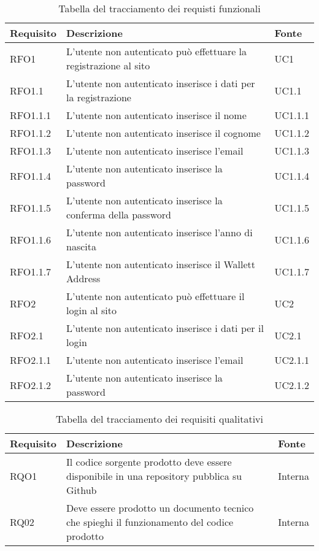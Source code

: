 \begin{table}[H]
\caption{Tabella del tracciamento dei requisti funzionali}
\label{tab:requisiti-funzionali}
\renewcommand{\arraystretch}{1.6}
\begin{tabularx}{\textwidth}{lXl}
\hline\hline
\textbf{Requisito} & \textbf{Descrizione} & \textbf{Fonte}\\
\hline
RFO1 & L'utente non autenticato può effettuare la registrazione al sito & UC1 \\
\hline
RFO1.1 & L'utente non autenticato inserisce i dati per la registrazione & UC1.1 \\
\hline
RFO1.1.1 & L'utente non autenticato inserisce il nome & UC1.1.1 \\
\hline
RFO1.1.2 & L'utente non autenticato inserisce il cognome & UC1.1.2 \\
\hline
RFO1.1.3 & L'utente non autenticato inserisce l'email & UC1.1.3 \\
\hline
RFO1.1.4 & L'utente non autenticato inserisce la password & UC1.1.4 \\
\hline
RFO1.1.5 & L'utente non autenticato inserisce la conferma della password & UC1.1.5 \\
\hline
RFO1.1.6 & L'utente non autenticato inserisce l'anno di nascita & UC1.1.6 \\
\hline
RFO1.1.7 & L'utente non autenticato inserisce il Wallett Address & UC1.1.7 \\
\hline
RFO2 & L'utente non autenticato può effettuare il login al sito & UC2 \\
\hline
RFO2.1 &L'utente non autenticato inserisce i dati per il login & UC2.1 \\
\hline
RFO2.1.1 & L'utente non autenticato inserisce l'email & UC2.1.1 \\
\hline
RFO2.1.2 & L'utente non autenticato inserisce  la password & UC2.1.2 \\
\hline
\end{tabularx}
\end{table}%

\begin{table}[H]
\caption{Tabella del tracciamento dei requisiti qualitativi}
\label{tab:requisiti-qualitativi}
\renewcommand{\arraystretch}{1.6}
\begin{tabularx}{\textwidth}{lXl}
\hline\hline
\textbf{Requisito} & \textbf{Descrizione} & \textbf{Fonte}\\
\hline
RQO1 & Il codice sorgente prodotto deve essere disponibile in una repository pubblica su Github & Interna \\
\hline
RQ02 & Deve essere prodotto un documento tecnico che spieghi il funzionamento del codice prodotto & Interna \\
\hline
\end{tabularx}
\end{table}%

